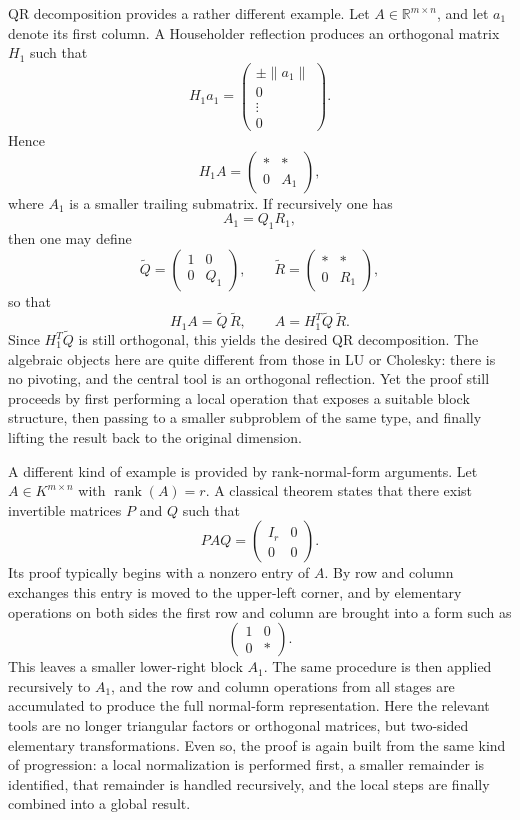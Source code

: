 \documentclass[pdflatex,sn-mathphys-num]{sn-jnl}%
\theoremstyle{thmstyleone}%
\theoremstyle{thmstyletwo}%
\theoremstyle{thmstylethree}%
\begin{document}
QR decomposition provides a rather different example. Let \(A\in\mathbb{R}^{m\times n}\), and let \(a_1\) denote its first column. A Householder reflection produces an orthogonal matrix \(H_1\) such that
\[
H_1a_1=
\begin{pmatrix}
\pm\|a_1\|\\
0\\
\vdots\\
0
\end{pmatrix}.
\]
Hence
\[
H_1A=
\begin{pmatrix}
* & *\\
0 & A_1
\end{pmatrix},
\]
where \(A_1\) is a smaller trailing submatrix. If recursively one has
\[
A_1=Q_1R_1,
\]
then one may define
\[
\widetilde Q=
\begin{pmatrix}
1 & 0\\
0 & Q_1
\end{pmatrix},
\qquad
\widetilde R=
\begin{pmatrix}
* & *\\
0 & R_1
\end{pmatrix},
\]
so that
\[
H_1A=\widetilde Q\,\widetilde R,
\qquad
A=H_1^{T}\widetilde Q\,\widetilde R.
\]
Since \(H_1^{T}\widetilde Q\) is still orthogonal, this yields the desired QR decomposition. The algebraic objects here are quite different from those in LU or Cholesky: there is no pivoting, and the central tool is an orthogonal reflection. Yet the proof still proceeds by first performing a local operation that exposes a suitable block structure, then passing to a smaller subproblem of the same type, and finally lifting the result back to the original dimension.

A different kind of example is provided by rank-normal-form arguments. Let \(A \in K^{m\times n}\) with \(\operatorname{rank}(A)=r\). A classical theorem states that there exist invertible matrices \(P\) and \(Q\) such that
\[
PAQ=
\begin{pmatrix}
I_r & 0\\
0 & 0
\end{pmatrix}.
\]
Its proof typically begins with a nonzero entry of \(A\). By row and column exchanges this entry is moved to the upper-left corner, and by elementary operations on both sides the first row and column are brought into a form such as
\[
\begin{pmatrix}
1 & 0\\
0 & *
\end{pmatrix}.
\]
This leaves a smaller lower-right block \(A_1\). The same procedure is then applied recursively to \(A_1\), and the row and column operations from all stages are accumulated to produce the full normal-form representation. Here the relevant tools are no longer triangular factors or orthogonal matrices, but two-sided elementary transformations. Even so, the proof is again built from the same kind of progression: a local normalization is performed first, a smaller remainder is identified, that remainder is handled recursively, and the local steps are finally combined into a global result.
\end{document}
